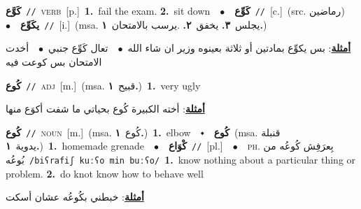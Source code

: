 \documentclass[10pt,a4paper,twoside]{article} %
\begin{document}
\begin{multicols}{2}
{\setlength\topsep{0pt}\textbf{\foreignlanguage{arabic}{كَوَّع}}\ {\color{gray}\texttt{//}\color{black}}\ \textsc{verb}\ [p.]\ \textbf{1.}~fail the exam.  \textbf{2.}~sit down\ \ $\bullet$\ \ \setlength\topsep{0pt}\textbf{\foreignlanguage{arabic}{كَوِّع}}\ {\color{gray}\texttt{//}\color{black}}\ [c.]\ (src. \color{gray}\foreignlanguage{arabic}{رماضين}\color{black})\ \ $\bullet$\ \ \setlength\topsep{0pt}\textbf{\foreignlanguage{arabic}{يكَوِّع}}\ {\color{gray}\texttt{//}\color{black}}\ [i.]\ \color{gray}(msa. \foreignlanguage{arabic}{يجلس}~\foreignlanguage{arabic}{\textbf{٣.}}  \foreignlanguage{arabic}{يخفق}~\foreignlanguage{arabic}{\textbf{٢.}}  .\foreignlanguage{arabic}{يرسب بالامتحان}~\foreignlanguage{arabic}{\textbf{١.}})\color{black}\  \begin{flushright}\color{gray}\foreignlanguage{arabic}{\textbf{\underline{\foreignlanguage{arabic}{أمثلة}}}: بس يكوِّع بمادتين أو ثلاثة بعينوه وزير ان شاء الله\ $\bullet$\ \  تعال كَوِّع جنبي\ $\bullet$\ \  أخدت الامتحان بس كوعت فيه}\end{flushright}\color{black}} \vspace{2mm}

{\setlength\topsep{0pt}\textbf{\foreignlanguage{arabic}{كُوع}}\ {\color{gray}\texttt{//}\color{black}}\ \textsc{adj}\ [m.]\ \color{gray}(msa. \foreignlanguage{arabic}{قبيح}~\foreignlanguage{arabic}{\textbf{١.}})\color{black}\ \textbf{1.}~very ugly\  \begin{flushright}\color{gray}\foreignlanguage{arabic}{\textbf{\underline{\foreignlanguage{arabic}{أمثلة}}}: أخته الكبيرة كُوع بحياتي ما شفت أكوَع منها}\end{flushright}\color{black}} \vspace{2mm}

{\setlength\topsep{0pt}\textbf{\foreignlanguage{arabic}{كُوع}}\ {\color{gray}\texttt{//}\color{black}}\ \textsc{noun}\ [m.]\ \color{gray}(msa. \foreignlanguage{arabic}{كُوع}~\foreignlanguage{arabic}{\textbf{١.}})\color{black}\ \textbf{1.}~elbow\ \ $\smblkdiamond$\ \ \setlength\topsep{0pt}\textbf{\foreignlanguage{arabic}{كُوع}}\ \color{gray}(msa. \foreignlanguage{arabic}{قنبلة يدوية}~\foreignlanguage{arabic}{\textbf{١.}})\color{black}\ \textbf{1.}~homemade grenade\ \ $\bullet$\ \ \setlength\topsep{0pt}\textbf{\foreignlanguage{arabic}{كْوَاع}}\ {\color{gray}\texttt{//}\color{black}}\ [pl.]\ \ $\bullet$\ \ \textsc{ph.} \color{gray} \foreignlanguage{arabic}{بِعرَفِش كُوعُه من بُوعُه}\color{black}\ {\color{gray}\texttt{/{\sffamily biʕrafiʃ kuːʕo min buːʕo}/}\color{black}}\ \textbf{1.}~know nothing about a particular thing or problem.  \textbf{2.}~do knot know how to behave well\  \begin{flushright}\color{gray}\foreignlanguage{arabic}{\textbf{\underline{\foreignlanguage{arabic}{أمثلة}}}: خبطني بكُوعُه عشان أسكت}\end{flushright}\color{black}} \vspace{2mm}


\end{multicols}
\end{document}
